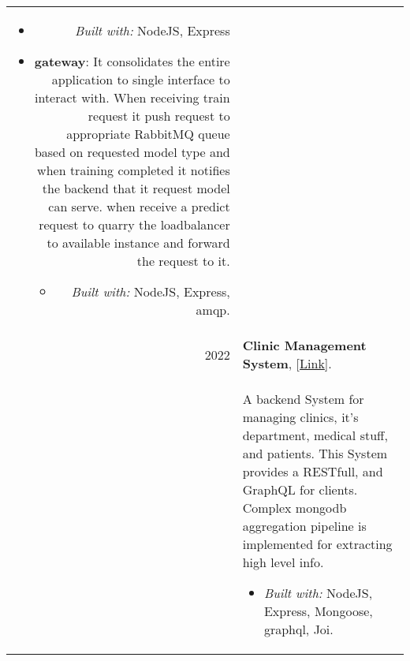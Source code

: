 \documentclass[a4paper,10pt]{article}
\begin{document}
\begin{longtable}{r p{16cm}}
\begin{itemize}
\begin{itemize}
                \item \textit{Built with: }NodeJS, Express
            \end{itemize}
        \end{itemize}
        \begin{itemize}
            \item \textbf{gateway}: It consolidates the entire application to single interface to interact with. When receiving train request it push request to appropriate RabbitMQ queue based on requested model type and when training  completed it notifies the backend that it request model can serve. when receive a predict request to quarry the loadbalancer to available instance and forward the request to it.
            \begin{itemize}
                \item \textit{Built with: }NodeJS, Express, amqp.
            \end{itemize}
        \end{itemize}
        \\
        2022  & \textbf{Clinic Management System}, [\href{https://github.com/zaky-fetoh/Clinic-Management-System}{Link}].\\&
        A backend System for managing clinics, it's department, medical stuff, and patients. This 	System provides a RESTfull, and GraphQL for clients. Complex mongodb aggregation pipeline 	is implemented for extracting high level info.
        \begin{itemize}
            \item \textit{Built with: } NodeJS, Express, Mongoose, graphql, Joi. 
        \end{itemize}\\



\end{longtable}
\end{document}
